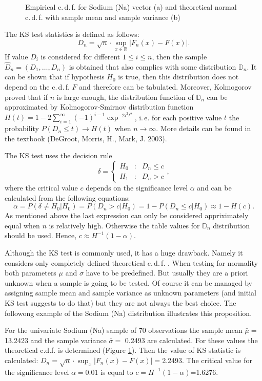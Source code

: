 \documentclass[a4paper, 12pt, titlepage, headsepline, listof = totoc, bibliography = totoc, numbers = noenddot]{scrartcl}
\newcommand{\ie}{i.\,e. }
\newcommand{\cdf}{c.\,d.\,f. }
\begin{document}
\begin{figure}[H]
\begin{subfigure}{.5\textwidth}
  \vspace{-1cm}
  \caption{}
  \label{fig:empiricTeorFunc}
\end{subfigure}
\caption{Empirical \cdf for Sodium (Na) vector (a) and theoretical normal \cdf with
sample mean and sample variance (b)}
\label{fig:commonFigureKStest}
\end{figure}

The KS test statistics is defined as follows:
\[D_n = \sqrt{n}\cdot \sup_{x \in \mathbb{R}}|F_n(x)-F(x)|.\]
If value $D_i$ is considered for different $1\le i\le n$, then the sample
$\hat{D}_n=(D_1,\dots,D_n)$ is obtained that also complies with some
distribution $\mathbb{D}_n$.
It can be shown that if hypothesis $H_0$ is true, then this distribution does not depend on the \cdf $F$
and therefore can be tabulated. Moreover, Kolmogorov proved that if $n$ is large
enough, the distribution function of $\mathbb{D}_n$ can be approximated by
Kolmogorov-Smirnov distribution function
$H(t)=1-2\sum_{i=1}^{\infty}(-1)^{i-1} \exp^{-2i^2t^2}$, \ie for each positive
value $t$ the probability $P(D_n\le t)\to H(t)$ when $n \to \infty$. More
details can be found in the textbook (DeGroot, Morris, H., Mark, J. 2003).

The KS test uses the decision rule
\[ \delta = 
\left\{
\begin{array}{rcl}
H_0&:& D_n\le c\\
H_1&:& D_n> c
\end{array}
\right.,
\]
where the critical value $c$ depends on the significance level $\alpha$ and
can be calculated from the following equations:
\[\alpha = P(\delta \ne H_0|H_0)=P(D_n>c|H_0)=1-P(D_n\le c|H_0)\approx 1-H(c).\]
As mentioned above the last expression can only be considered appriximately equal when $n$ is
relatively high. Otherwise the table values for $\mathbb{D}_n$ distribution
should be used. Hence, $c\approx H^{-1}(1-\alpha)$.

Although the KS test is commonly used, it has a huge drawback. Namely it
considers only completely defined theoretical \cdf. When testing for normality 
both parameters $\mu$ and $\sigma$ have to be predefined. But usually they are
a priori unknown when a sample is going to be tested. Of course it can be
managed by assigning sample mean and sample variance as unknown parameters (and
initial KS test suggests to do that) but they are not always the best choice.
The followong example of the Sodium (Na) distribution illustrates this proposition. 

For the univariate Sodium (Na) sample of 70 observations the sample mean
$\bar{\mu}=$13.2423 and the sample variance $\bar{\sigma}=$
0.2493 are calculated. For these values the
theoretical c.d.f. is determined (Figure \ref{fig:empiricTeorFunc}). Then
the value of KS statistic is calculated: $D_n=\sqrt{n}\cdot
\sup_x|F_n(x)-F(x)|=$2.2493.
The critical value for the significance level $\alpha=0.01$ is equal to
$c=H^{-1}(1-\alpha)$=1.6276. 
\end{document}
